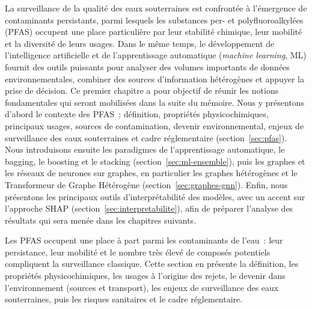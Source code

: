 \label{chap:generalites}

\label{sec:intro-chap1}

La surveillance de la qualit\'e des eaux souterraines est confront\'ee \`a l'\'emergence de contaminants persistants, parmi lesquels les substances per- et polyfluoroalkyl\'ees (PFAS) occupent une place particuli\`ere par leur stabilit\'e chimique, leur mobilit\'e et la diversit\'e de leurs usages.
Dans le m\^eme temps, le d\'eveloppement de l'intelligence artificielle et de l'apprentissage automatique (\emph{machine learning}, ML) fournit des outils puissants pour analyser des volumes importants de donn\'ees environnementales, combiner des sources d'information h\'et\'erog\`enes et appuyer la prise de d\'ecision.
Ce premier chapitre a pour objectif de r\'eunir les notions fondamentales qui seront mobilis\'ees dans la suite du m\'emoire.
Nous y pr\'esentons d'abord le contexte des PFAS~: d\'efinition, propri\'et\'es physicochimiques, principaux usages, sources de contamination, devenir environnemental, enjeux de surveillance des eaux souterraines et cadre r\'eglementaire (section~\ref{sec:pfas}).
Nous introduisons ensuite les paradigmes de l'apprentissage automatique, le bagging, le boosting et le stacking (section~\ref{sec:ml-ensemble}), puis les graphes et les r\'eseaux de neurones sur graphes, en particulier les graphes h\'et\'erog\`enes et le Transformeur de Graphe H\'et\'erog\`ene (section~\ref{sec:graphes-gnn}).
Enfin, nous pr\'esentons les principaux outils d'interpr\'etabilit\'e des mod\`eles, avec un accent sur l'approche SHAP (section~\ref{sec:interpretabilite}), afin de pr\'eparer l'analyse des r\'esultats qui sera men\'ee dans les chapitres suivants.



\label{sec:pfas}

Les PFAS occupent une place \`a part parmi les contaminants de l'eau~: leur persistance, leur mobilit\'e et le nombre tr\`es \'elev\'e de compos\'es potentiels compliquent la surveillance classique.
Cette section en pr\'esente la d\'efinition, les propri\'et\'es physicochimiques, les usages \`a l'origine des rejets, le devenir dans l'environnement (sources et transport), les enjeux de surveillance des eaux souterraines, puis les risques sanitaires et le cadre r\'eglementaire.


